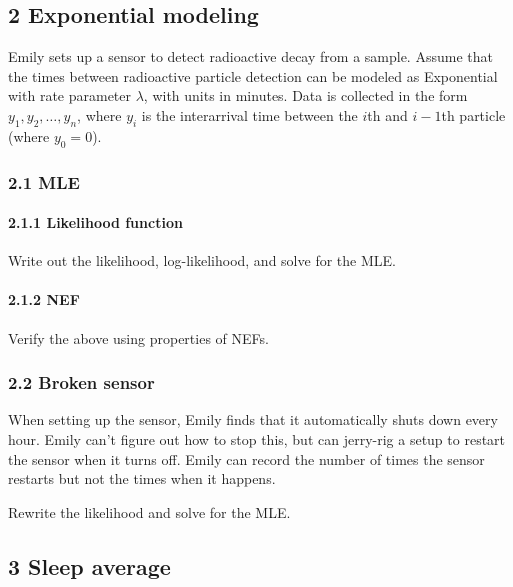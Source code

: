 \documentclass[
]{article}
\begin{document}
\hypertarget{exponential-modeling}{%
\subsection{2 Exponential modeling}\label{exponential-modeling}}

Emily sets up a sensor to detect radioactive decay from a sample. Assume
that the times between radioactive particle detection can be modeled as
Exponential with rate parameter \(\lambda\), with units in minutes. Data
is collected in the form \(y_1, y_2, \dots, y_n\), where \(y_i\) is the
interarrival time between the \(i\)th and \(i - 1\)th particle (where
\(y_0 = 0\)).

\hypertarget{mle}{%
\subsubsection{2.1 MLE}\label{mle}}

\hypertarget{likelihood-function}{%
\paragraph{2.1.1 Likelihood function}\label{likelihood-function}}

Write out the likelihood, log-likelihood, and solve for the MLE.

\hypertarget{nef}{%
\paragraph{2.1.2 NEF}\label{nef}}

Verify the above using properties of NEFs.

\hypertarget{broken-sensor}{%
\subsubsection{2.2 Broken sensor}\label{broken-sensor}}

When setting up the sensor, Emily finds that it automatically shuts down
every hour. Emily can't figure out how to stop this, but can jerry-rig a
setup to restart the sensor when it turns off. Emily can record the
number of times the sensor restarts but not the times when it happens.

Rewrite the likelihood and solve for the MLE.

\hypertarget{sleep-average}{%
\subsection{3 Sleep average}\label{sleep-average}}
\end{document}

